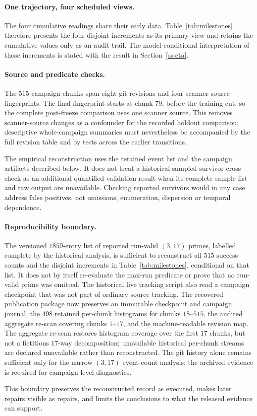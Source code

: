 \paragraph{One trajectory, four scheduled views.}
The four cumulative readings share their early data.  Table~\ref{tab:milestones}
therefore presents the four disjoint increments as its primary view and retains
the cumulative values only as an audit trail.  The model-conditional
interpretation of those increments is stated with the result in
Section~\ref{ss:eta}.

\paragraph{Source and predicate checks.}
The $515$ campaign chunks span eight git revisions and four scanner-source
fingerprints.  The final fingerprint starts at chunk $79$, before the training
cut, so the complete post-freeze comparison uses one scanner source.  This
removes scanner-source changes as a confounder for the recorded holdout comparison;
descriptive whole-campaign summaries must nevertheless be accompanied by the
full revision table and by tests across the earlier transitions.

The empirical reconstruction uses the retained event list and the campaign
artifacts described below. It does not treat a historical sampled-survivor
cross-check as an additional quantified validation result when its complete
sample list and raw output are unavailable. Checking reported survivors would
in any case address false positives, not omissions, enumeration, dispersion
or temporal dependence.

\paragraph{Reproducibility boundary.}
The versioned $1859$-entry list of reported run-valid $(3,17)$ primes, labelled
complete by the historical analysis, is sufficient to reconstruct all $515$
success counts and the disjoint increments in Table~\ref{tab:milestones},
conditional on that list.  It does not by itself re-evaluate the max-run
predicate or prove that no run-valid prime was omitted.
The historical live tracking script also read a campaign checkpoint that was
not part of ordinary source tracking. The recovered publication package now
preserves an immutable checkpoint and campaign journal, the $498$ retained
per-chunk histograms for chunks $18$--$515$, the audited aggregate re-scan
covering chunks $1$--$17$, and the machine-readable revision map.  The aggregate
re-scan restores histogram coverage over the first $17$ chunks, but not a
fictitious $17$-way decomposition; unavailable historical per-chunk streams
are declared unavailable rather than reconstructed.  The git history alone
remains sufficient only for the narrow $(3,17)$ event-count analysis; the
archived evidence is required for campaign-level diagnostics.

This boundary preserves the reconstructed record as executed, makes later
repairs visible as repairs, and limits the conclusions to what the released
evidence can support.
